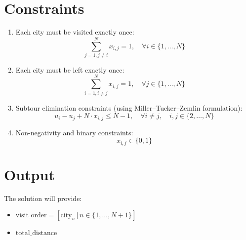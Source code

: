 \documentclass{article}
\begin{document}
\section*{Constraints}
\begin{enumerate}
    \item Each city must be visited exactly once:
    \[
    \sum_{j=1, j \neq i}^{N} x_{i,j} = 1, \quad \forall i \in \{1, \ldots, N\}
    \]
    \item Each city must be left exactly once:
    \[
    \sum_{i=1, i \neq j}^{N} x_{i,j} = 1, \quad \forall j \in \{1, \ldots, N\}
    \]
    \item Subtour elimination constraints (using Miller–Tucker–Zemlin formulation):
    \[
    u_i - u_j + N \cdot x_{i,j} \leq N-1, \quad \forall i \neq j, \quad i,j \in \{2, \ldots, N\}
    \]
    \item Non-negativity and binary constraints:
    \[
    x_{i,j} \in \{0, 1\}
    \]
\end{enumerate}

\section*{Output}
The solution will provide:
\begin{itemize}
    \item \( \text{visit\_order} = [ \text{city}_n \,|\, n \in \{1, \ldots, N+1\} ] \)
    \item \( \text{total\_distance} \)
\end{itemize}
\end{document}
